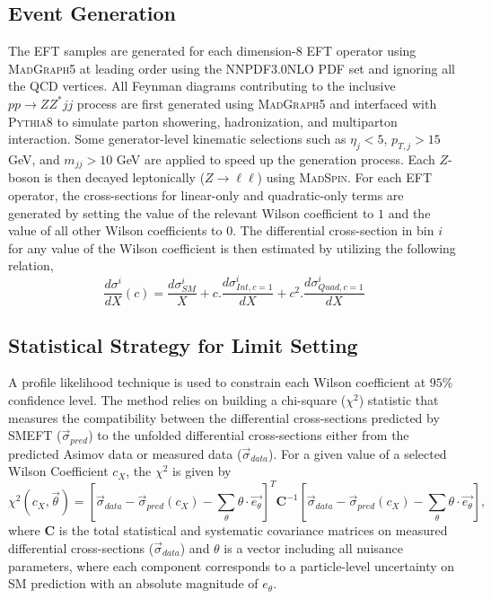 \subsection{Event Generation}
\label{subsec:EFT_EventGen}
The EFT samples are generated for each dimension-8 EFT operator using \textsc{MadGraph5} at leading order using the NNPDF3.0NLO PDF set and ignoring all the QCD vertices.
All Feynman diagrams contributing to the inclusive $pp \rightarrow ZZ^* jj$ process are first generated using \textsc{MadGraph5} and interfaced with \textsc{Pythia8} to simulate parton showering, hadronization, and multiparton interaction. Some generator-level kinematic selections such as $\eta_{j}<5$, $p_{T,j} > 15$ GeV, and $m_{jj} > 10$ GeV are applied to speed up the generation process. Each $Z$-boson is then decayed leptonically ($Z\rightarrow \ell \ell$) using \textsc{MadSpin}. For each EFT operator, the cross-sections for linear-only and quadratic-only terms are generated by setting the value of the relevant Wilson coefficient to $1$ and the value of all other Wilson coefficients to $0$. The differential cross-section in bin $i$ for any value of the Wilson coefficient is then estimated by utilizing the following relation,
\begin{equation}
\frac{d\sigma ^{i}}{dX}(c) = \frac{d\sigma ^{i}_{SM}}{X} + c . \frac{d\sigma ^{i}_{Int, c=1}}{dX} + c^2 . \frac{d\sigma ^{i}_{Quad, c=1}}{dX}
\label{eqn:DiffxS_EFT}
\end{equation}

\subsection{Statistical Strategy for Limit Setting}
\label{subsec:EFT_Method}
A profile likelihood technique \cite{ProfileLikelihood} is used to constrain each Wilson coefficient at $95\%$ confidence level. The method relies on building a chi-square ($\chi^2$) statistic that measures the compatibility between the differential cross-sections predicted by SMEFT ($\vec{\sigma}_{pred}$) to the unfolded differential cross-sections either from the predicted Asimov data or measured data ($\vec{\sigma}_{data}$). For a given value of a selected Wilson Coefficient $c_X$, the $\chi^2$ is given by
\begin{equation}
    \chi^2(c_X, \vec{\theta}) = [\vec{\sigma}_{data} - \vec{\sigma}_{pred}(c_X)- \sum_{\theta}\theta\cdot\vec{e_\theta} ]^T \textbf{C}^{-1}[\vec{\sigma}_{data}  - \vec{\sigma}_{pred}(c_X) - \sum_{\theta}\theta\cdot\vec{e_\theta}],
    \label{eq:eftchi2}
\end{equation} 
where $\textbf{C}$ is the total statistical and systematic covariance matrices on measured differential cross-sections ($\vec{\sigma}_{data}$) and $\theta$ is a vector including all nuisance parameters, where each component corresponds to a particle-level uncertainty on SM prediction with an absolute magnitude of $e_{\theta}$.

